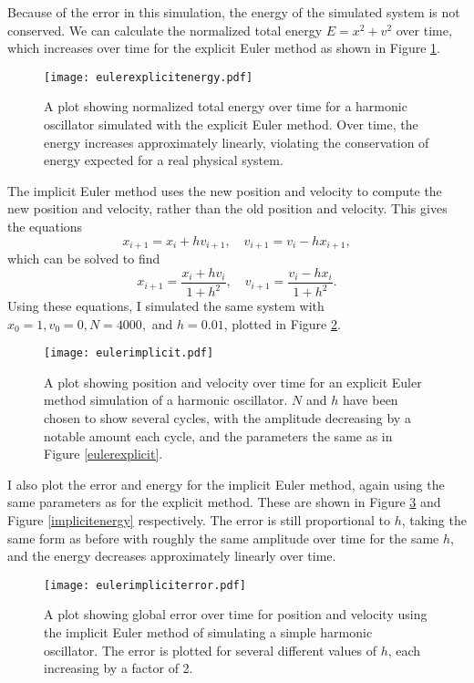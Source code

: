 \documentclass{article}
\begin{document}
Because of the error in this simulation, the energy of the simulated system is not conserved. We can calculate the normalized total energy $E=x^2+v^2$ over time, which increases over time for the explicit Euler method as shown in Figure \ref{explicitenergy}. 

\begin{figure}[H]
	\centering
	\texttt{[image: eulerexplicitenergy.pdf]}
	\caption{A plot showing normalized total energy over time for a harmonic oscillator simulated with the explicit Euler method. Over time, the energy increases approximately linearly, violating the conservation of energy expected for a real physical system.}
	\label{explicitenergy}
\end{figure}

The implicit Euler method uses the new position and velocity to compute the new position and velocity, rather than the old position and velocity. This gives the equations $$x_{i+1}=x_i+hv_{i+1},\quad v_{i+1}=v_i-hx_{i+1},$$ which can be solved to find $$x_{i+1}=\frac{x_i+hv_i}{1+h^2},\quad v_{i+1}=\frac{v_i-hx_i}{1+h^2}.$$ Using these equations, I simulated the same system with $x_0=1,v_0=0,N=4000,$ and $h=0.01$, plotted in Figure \ref{eulerimplicit}.

\begin{figure}[H]
	\centering
	\texttt{[image: eulerimplicit.pdf]}
	\caption{A plot showing position and velocity over time for an explicit Euler method simulation of a harmonic oscillator. $N$ and $h$ have been chosen to show several cycles, with the amplitude decreasing by a notable amount each cycle, and the parameters the same as in Figure \ref{eulerexplicit}.}
	\label{eulerimplicit}
\end{figure}

I also plot the error and energy for the implicit Euler method, again using the same parameters as for the explicit method. These are shown in Figure \ref{impliciterror} and Figure \ref{implicitenergy} respectively. The error is still proportional to $h$, taking the same form as before with roughly the same amplitude over time for the same $h$, and the energy decreases approximately linearly over time.

\begin{figure}[H]
	\centering
	\texttt{[image: eulerimpliciterror.pdf]}
	\caption{A plot showing global error over time for position and velocity using the implicit Euler method of simulating a simple harmonic oscillator. The error is plotted for several different values of $h$, each increasing by a factor of 2.}
	\label{impliciterror}
\end{figure}
\end{document}
